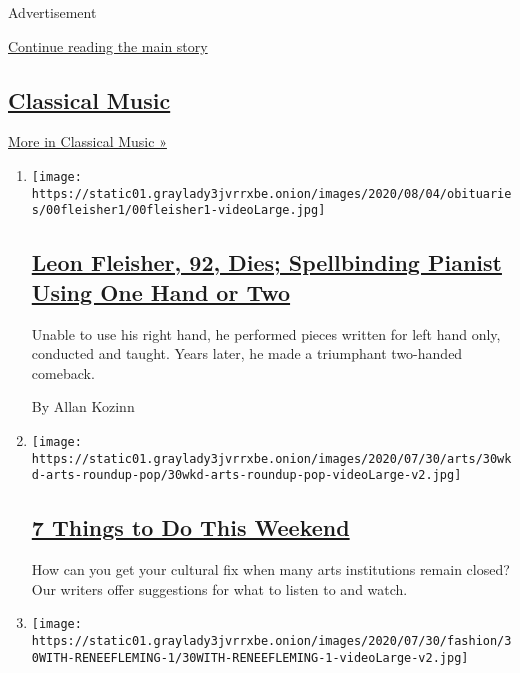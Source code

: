 Advertisement

\protect\hyperlink{after-mid1}{Continue reading the main story}

\hypertarget{classical-music}{%
\subsection{\texorpdfstring{\href{/spotlight/classical-music-reviews}{Classical
Music}}{Classical Music}}\label{classical-music}}

\href{/spotlight/classical-music-reviews}{More in Classical Music »}

\begin{enumerate}
\def\labelenumi{\arabic{enumi}.}
\item
  \texttt{[image: https://static01.graylady3jvrrxbe.onion/images/2020/08/04/obituaries/00fleisher1/00fleisher1-videoLarge.jpg]}

  \hypertarget{leon-fleisher-92-dies-spellbinding-pianist-using-one-hand-or-two}{%
  \subsection{\texorpdfstring{\href{/2020/08/02/arts/music/leon-fleisher-dead.html}{Leon
  Fleisher, 92, Dies; Spellbinding Pianist Using One Hand or
  Two}}{Leon Fleisher, 92, Dies; Spellbinding Pianist Using One Hand or Two}}\label{leon-fleisher-92-dies-spellbinding-pianist-using-one-hand-or-two}}

  Unable to use his right hand, he performed pieces written for left
  hand only, conducted and taught. Years later, he made a triumphant
  two-handed comeback.

  By Allan Kozinn
\item
  \texttt{[image: https://static01.graylady3jvrrxbe.onion/images/2020/07/30/arts/30wkd-arts-roundup-pop/30wkd-arts-roundup-pop-videoLarge-v2.jpg]}

  \hypertarget{7-things-to-do-this-weekend}{%
  \subsection{\texorpdfstring{\href{/2020/07/30/arts/things-to-do-weekend-coronavirus.html}{7
  Things to Do This
  Weekend}}{7 Things to Do This Weekend}}\label{7-things-to-do-this-weekend}}

  How can you get your cultural fix when many arts institutions remain
  closed? Our writers offer suggestions for what to listen to and watch.
\item
  \texttt{[image: https://static01.graylady3jvrrxbe.onion/images/2020/07/30/fashion/30WITH-RENEEFLEMING-1/30WITH-RENEEFLEMING-1-videoLarge-v2.jpg]}


\end{enumerate}
